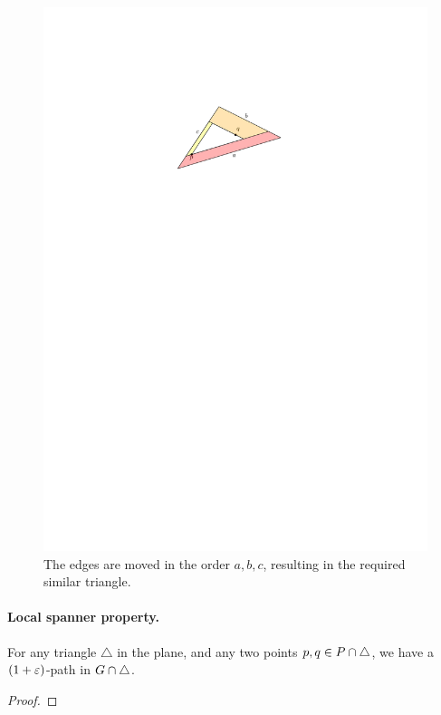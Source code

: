 \documentclass[12pt]{article}%
\begin{document}
\begin{figure}[h]
   	\centering
	\includegraphics{figs/shrink_tri}
	\caption{The edges are moved in the order $a,b,c$, resulting in the required similar triangle.}
\end{figure}



\paragraph{Local spanner property.}
\begin{lemma}
	For any triangle $\triangle$ in the plane, and any two
	points $p, q \in P \cap \triangle$, we have a $(1+\varepsilon)$-path in
	$G \cap {\triangle}$.
\end{lemma}
\begin{proof}

\end{proof}
\end{document}
